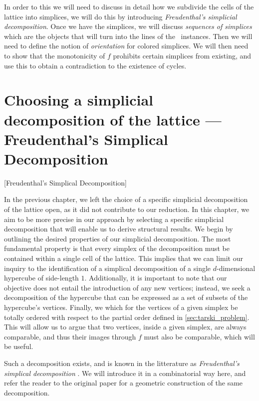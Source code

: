 In order to this we will need to discuss in detail how we subdivide the cells of the lattice into simplices, we will do this by introducing \emph{Freudenthal's simplicial decomposition}. Once we have the simplices, we will discuss \emph{sequences of simplices} which are the objects that will turn into the lines of the \EndOfLine\ instances. Then we will need to define the notion of \emph{orientation} for colored simplices. We will then need to show that the monotonicity of $f$ prohibits certain simplices from existing, and use this to obtain a contradiction to the existence of cycles.

\section{Choosing a simplicial decomposition of the lattice --- Freudenthal's Simplical Decomposition}[Freudenthal's Simplical Decomposition]
\label{sec:freudenthal_simplicial_decomposition}

In the previous chapter, we left the choice of a specific simplicial decomposition of the lattice open, as it did not contribute to our reduction. In this chapter, we aim to be more precise in our approach by selecting a specific simplicial decomposition that will enable us to derive structural results. We begin by outlining the desired properties of our simplicial decomposition. The most fundamental property is that every simplex of the decomposition must be contained within a single cell of the lattice. This implies that we can limit our inquiry to the identification of a simplical decomposition of a single $d$-dimensional hypercube of side-length $1$. Additionally, it is important to note that our objective does not entail the introduction of any new vertices; instead, we seek a decomposition of the hypercube that can be expressed as a set of subsets of the hypercube's vertices.	Finally, we which for the vertices of a given simplex be totally ordered with respect to the partial order defined in \cref{sec:tarski_problem}. This will allow us to argue that two vertices, inside a given simplex, are always comparable, and thus their images through $f$ must also be comparable, which will be useful.

Such a decomposition exists, and is known in the litterature as \textit{Freudenthal's simplical decomposition} . We will introduce it in a combinatorial way here, and refer the reader to the original paper for a geometric construction of the same decomposition.

